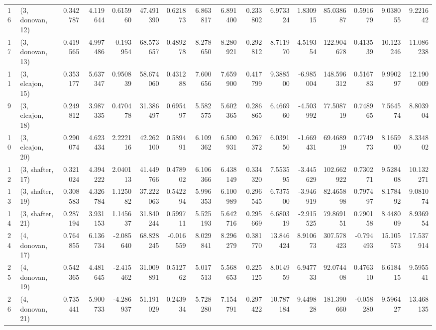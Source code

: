 \begin{tabular}{llrrrrrrrrrrrrrr}
16 &  (3, donovan, 12) &   0.342787 &  4.119644 &  0.615960 &   47.491390 &  0.621873 &   6.863817 &   6.891400 &  0.233802 &   6.973324 &  1.830915 &   85.038687 &  0.591679 &   9.038055 &   9.221642 \\
17 &  (3, donovan, 13) &   0.419565 &  4.997486 & -0.193954 &   68.573657 &  0.489278 &   8.278650 &   8.280921 &  0.292812 &   8.711970 &  4.519354 &  122.904678 &  0.413539 &  10.123246 &  11.086238 \\
11 &  (3, elcajon, 15) &   0.353177 &  5.637347 &  0.950839 &   58.674060 &  0.431288 &   7.600656 &   7.659900 &  0.417799 &   9.388500 & -6.985004 &  148.596312 &  0.516783 &   9.990297 &  12.190009 \\
9  &  (3, elcajon, 18) &   0.249812 &  3.987335 &  0.470478 &   31.386497 &  0.695497 &   5.582575 &   5.602365 &  0.286865 &   6.466960 & -4.503992 &   77.508719 &  0.748965 &   7.564574 &   8.803904 \\
10 &  (3, elcajon, 20) &   0.290074 &  4.623434 &  2.222116 &   42.262100 &  0.589491 &   6.109362 &   6.500931 &  0.267372 &   6.039150 & -1.669431 &   69.468919 &  0.774973 &   8.165900 &   8.334802 \\
12 &  (3, shafter, 17) &   0.321024 &  4.394222 &  2.040113 &   41.449766 &  0.478902 &   6.106366 &   6.438149 &  0.334320 &   7.553595 & -3.445629 &  102.662922 &  0.730271 &   9.528408 &  10.132271 \\
13 &  (3, shafter, 19) &   0.308583 &  4.326784 &  1.125082 &   37.222063 &  0.542294 &   5.996353 &   6.100989 &  0.296545 &   6.737500 & -3.946919 &   82.465898 &  0.797497 &   8.178492 &   9.081074 \\
14 &  (3, shafter, 21) &   0.287194 &  3.931153 &  1.145637 &   31.840244 &  0.599711 &   5.525193 &   5.642716 &  0.295669 &   6.680319 & -2.915525 &   79.869151 &  0.790158 &   8.448009 &   8.936954 \\
24 &  (4, donovan, 17) &   0.764855 &  6.136734 & -2.085640 &   68.828245 & -0.016559 &   8.029841 &   8.296279 &  0.381770 &  13.846424 &  8.910673 &  307.578423 & -0.794493 &  15.105573 &  17.537914 \\
25 &  (4, donovan, 19) &   0.542365 &  4.481645 & -2.415462 &   31.009891 &  0.512762 &   5.017513 &   5.568653 &  0.225125 &   8.014959 &  6.947733 &   92.074408 &  0.476310 &   6.618415 &   9.595541 \\
26 &  (4, donovan, 21) &   0.735441 &  5.900733 & -4.286937 &   51.191029 &  0.243934 &   5.728280 &   7.154791 &  0.297422 &  10.787184 &  9.449828 &  181.390660 & -0.058280 &   9.596427 &  13.468135 \\

\end{tabular}

